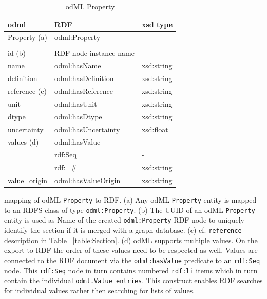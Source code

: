 \documentclass{article}
\begin{document}
\begin{table}
\begin{threeparttable}
\begin{tabular}{p{3.5cm}p{5cm}p{2cm}}
\toprule
    odml            & RDF                           & xsd type \\
\midrule
    Property (a)    & odml:Property                 & - \\
                    & & \\
    id (b)          & RDF node instance name        & - \\
    name            & odml:hasName                  & xsd:string \\
    definition      & odml:hasDefinition            & xsd:string \\
    reference (c)   & odml:hasReference             & xsd:string \\
    unit            & odml:hasUnit                  & xsd:string \\
    dtype           & odml:hasDtype                 & xsd:string \\
    uncertainty     & odml:hasUncertainty           & xsd:float \\
    values (d)      & odml:hasValue                 & - \\
                    & rdf:Seq                       & - \\
                    & rdf:\_\#                      & xsd:string \\
    value\_origin    & odml:hasValueOrigin           & xsd:string \\
\bottomrule
\end{tabular}
\caption{odML Property}
\begin{tablenotes}
\item mapping of odML \texttt{Property} to RDF. (a) Any odML \texttt{Property} entity is mapped to an RDFS class of type \texttt{odml:Property}. (b) The UUID of an odML \texttt{Property} entity is used as Name of the created \texttt{odml:Property} RDF node to uniquely identify the section if it is merged with a graph database. (c) cf. \texttt{reference} description in Table ~\ref{table:Section}. (d) odML supports multiple values. On the export to RDF the order of these values need to be respected as well. Values are connected to the RDF document via the \texttt{odml:hasValue} predicate to an \texttt{rdf:Seq} node. This \texttt{rdf:Seq} node in turn contains numbered \texttt{rdf:li} items which in turn contain the individual \texttt{odml.Value entries}. This construct enables RDF searches for individual values rather then searching for lists of values.
\end{tablenotes}
\label{table:Property}
\end{threeparttable}
\end{table}
\end{document}
